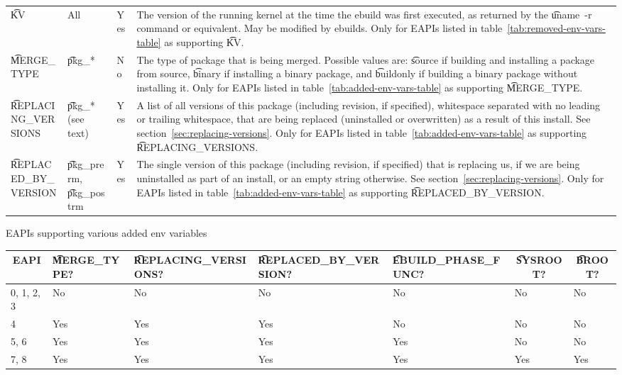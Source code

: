 \begin{landscape}
\begin{longtable}{!{\extracolsep{\fill}} l P{7.5em} l p{35em}}
\t{KV} &
    All &
    Yes &
     The version of the running kernel at the time the ebuild was first executed,
    as returned by the \t{uname~-r} command or equivalent.  May be modified by ebuilds.  Only for
    EAPIs listed in table~\ref{tab:removed-env-vars-table} as supporting \t{KV}. \\
\t{MERGE_TYPE} &
    \t{pkg_*} &
    No &
     The type of package that is being merged. Possible values are:
    \t{source} if building and installing a package from source, \t{binary} if installing a binary
    package, and \t{buildonly} if building a binary package without installing it. Only for EAPIs
    listed in table~\ref{tab:added-env-vars-table} as supporting \t{MERGE_TYPE}. \\
\t{REPLACING_VERSIONS} &
    \t{pkg_*} (see text) &
    Yes &
    A list of all versions of this package (including revision, if specified), whitespace separated
    with no leading or trailing whitespace, that are being replaced (uninstalled or overwritten)
    as a result of this install. See section~\ref{sec:replacing-versions}. Only for EAPIs listed
    in table~\ref{tab:added-env-vars-table} as supporting \t{REPLACING_VERSIONS}. \\
\t{REPLACED_BY_VERSION} &
    \t{pkg_prerm}, \t{pkg_postrm} &
    Yes &
    The single version of this package (including revision, if specified) that is replacing us,
    if we are being uninstalled as part of an install, or an empty string otherwise.
    See section~\ref{sec:replacing-versions}. Only for EAPIs listed in
    table~\ref{tab:added-env-vars-table} as supporting \t{REPLACED_BY_VERSION}. \\
\end{longtable}
\end{landscape}

\begin{centertable}{EAPIs supporting various added env variables}
    \label{tab:added-env-vars-table}
    \begin{tabular}{lllllll}
      \toprule
      \multicolumn{1}{c}{\textbf{EAPI}} &
      \multicolumn{1}{P{3.25em}}{\textbf{\t{MERGE_TYPE}?}} &
      \multicolumn{1}{P{5.25em}}{\textbf{\t{REPLACING_VERSIONS}?}} &
      \multicolumn{1}{P{5.75em}}{\textbf{\t{REPLACED_BY_VERSION}?}} &
      \multicolumn{1}{P{5.75em}}{\textbf{\t{EBUILD_PHASE_FUNC}?}} &
      \multicolumn{1}{c}{\textbf{\t{SYSROOT}?}} &
      \multicolumn{1}{c}{\textbf{\t{BROOT}?}} \\
      \midrule
      0, 1, 2, 3        & No  & No  & No  & No  & No  & No  \\
      4                 & Yes & Yes & Yes & No  & No  & No  \\
      5, 6              & Yes & Yes & Yes & Yes & No  & No  \\
      7, 8              & Yes & Yes & Yes & Yes & Yes & Yes \\
      \bottomrule
    \end{tabular}
\end{centertable}

